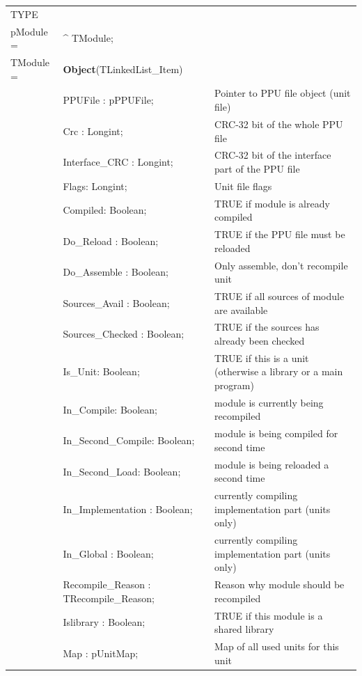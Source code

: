 \documentclass [a4paper,12pt]{article}
\begin{document}
\begin{longtable}{|l@{\extracolsep{\fill}}lp{7cm}|}
\hline
\endhead
\hline
\endfoot
\textsf{TYPE}& & \\
\xspace pModule = & \^{}  TModule; & \\
\xspace \textsf{TModule} = & \textbf{Object}(TLinkedList\_Item) & \\
&\textsf{PPUFile : pPPUFile;}& Pointer to PPU file object (unit file) \\
&\textsf{Crc : Longint;}& CRC-32 bit of the whole PPU file \\
&\textsf{Interface{\_}CRC : Longint;}& CRC-32 bit of the interface part of the PPU file \\
&\textsf{Flags: Longint;}& Unit file flags \\
&\textsf{Compiled: Boolean;}& TRUE if module is already compiled \\
&\textsf{Do{\_}Reload : Boolean;}	& TRUE if the PPU file must be reloaded \\
&\textsf{Do{\_}Assemble : Boolean;}	& Only assemble, don't recompile unit \\
&\textsf{Sources{\_}Avail : Boolean;}	& TRUE if all sources of module are available \\
&\textsf{Sources{\_}Checked : Boolean;}	& TRUE if the sources has already been checked \\
&\textsf{Is{\_}Unit: Boolean;}		& TRUE if this is a unit (otherwise a library or a main program) \\
&\textsf{In{\_}Compile: Boolean;}	& module is currently being recompiled \\
&\textsf{In{\_}Second{\_}Compile: Boolean;}& module is being compiled for second time \\
&\textsf{In{\_}Second{\_}Load: Boolean;}	& module is being reloaded a second time \\
&\textsf{In{\_}Implementation : Boolean;}& currently compiling implementation part (units only) \\
&\textsf{In{\_}Global : Boolean;}	& currently compiling implementation part (units only) \\
&\textsf{Recompile{\_}Reason : TRecompile{\_}Reason;}& Reason why module should be recompiled \\
&\textsf{Islibrary : Boolean;}& 		TRUE if this module is a shared library \\
&\textsf{Map : pUnitMap;}		& Map of all used units for this unit \\

\end{longtable}
\end{document}
